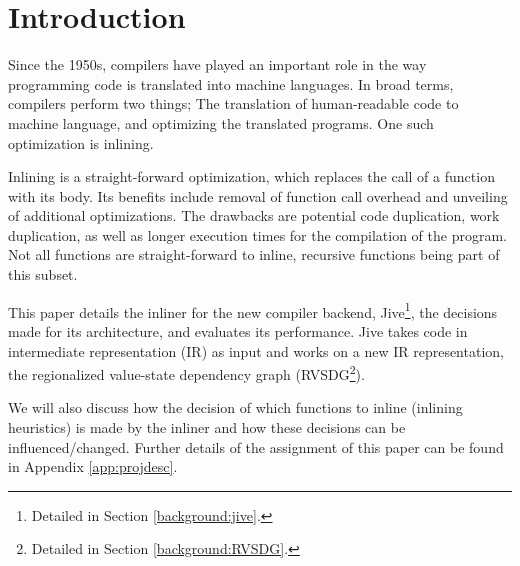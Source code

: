 
\section{Introduction}

Since the 1950s, compilers have played an important role in the way programming
code is translated into machine languages. In broad terms, compilers perform two
things; The translation of human-readable code to machine language, and
optimizing the translated programs. One such optimization is inlining.

Inlining is a straight-forward optimization, which replaces the call of a
function with its body. Its benefits include removal of function call overhead
and unveiling of additional optimizations. The drawbacks are potential code
duplication, work duplication, as well as longer execution times for the
compilation of the program. Not all functions are straight-forward to inline,
recursive functions being part of this subset.

This paper details the inliner for the new compiler backend,
Jive\footnote{Detailed in Section \ref{background:jive}.}, the decisions made
for its architecture, and evaluates its performance. Jive takes code in
intermediate representation (IR) as input and works on a new IR representation,
the regionalized value-state dependency graph (RVSDG\footnote{Detailed in
Section \ref{background:RVSDG}.}).

We will also discuss how the decision of which functions to inline (inlining
heuristics) is made by the inliner and how these decisions can be
influenced/changed. Further details of the assignment of this paper can be found
in Appendix \ref{app:projdesc}. \\


